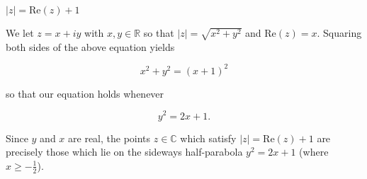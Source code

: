 $ \left| z \right| = \text{Re}(z) + 1 $

\begin{solution}
    We let $z = x + i y$ with $x, y \in \mathbb{R}$ so that $\left| z \right| = \sqrt{x^2 + y^2}$ and 
    $\text{Re}(z) = x$. Squaring both sides of the above equation yields

    $$
    x^2 + y^2 = (x + 1)^2
    $$

    so that our equation holds whenever

    $$
    y^2 = 2 x + 1.
    $$

    Since $y$ and $x$ are real, the points $z \in \mathbb{C}$ which satisfy $|z| = \text{Re}(z) + 1$ are precisely those
    which lie on the sideways half-parabola $y^2 = 2 x + 1$ (where $x \ge -\frac{1}{2}$).


    \ \\
\end{solution}